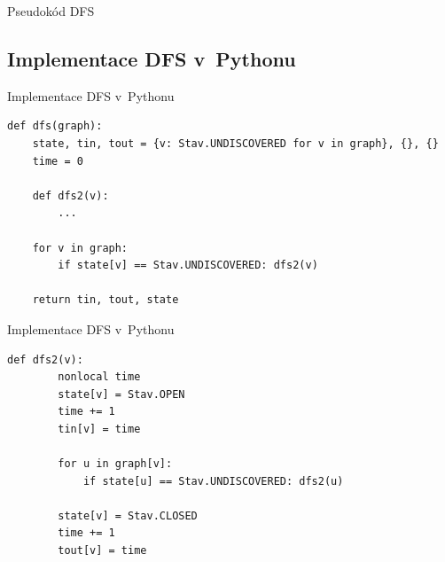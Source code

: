 \documentclass[11pt,professionalfont,aspectratio=43]{beamer}
\begin{document}
    \begin{frame}{Pseudokód DFS}
        \begin{center}
            \begin{minipage}{0.9\textwidth}
                \begin{algorithm}[H]
                    \caption{DFS (pokračování)}
                    \setcounter{AlgoLine}{5}
                \end{algorithm}
            \end{minipage}
        \end{center}
    \end{frame}

    \subsection{Implementace DFS v~Pythonu}

    \begin{frame}[fragile]{Implementace DFS v~Pythonu}
        \begin{lstlisting}[style=python]
def dfs(graph):
    state, tin, tout = {v: Stav.UNDISCOVERED for v in graph}, {}, {}
    time = 0

    def dfs2(v):
        ...

    for v in graph:
        if state[v] == Stav.UNDISCOVERED: dfs2(v)

    return tin, tout, state
        \end{lstlisting}
    \end{frame}

    \begin{frame}[fragile]{Implementace DFS v~Pythonu}
        \begin{lstlisting}[style=python]
    def dfs2(v):
        nonlocal time
        state[v] = Stav.OPEN
        time += 1
        tin[v] = time

        for u in graph[v]:
            if state[u] == Stav.UNDISCOVERED: dfs2(u)

        state[v] = Stav.CLOSED
        time += 1
        tout[v] = time
        \end{lstlisting}
    \end{frame}
\end{document}
